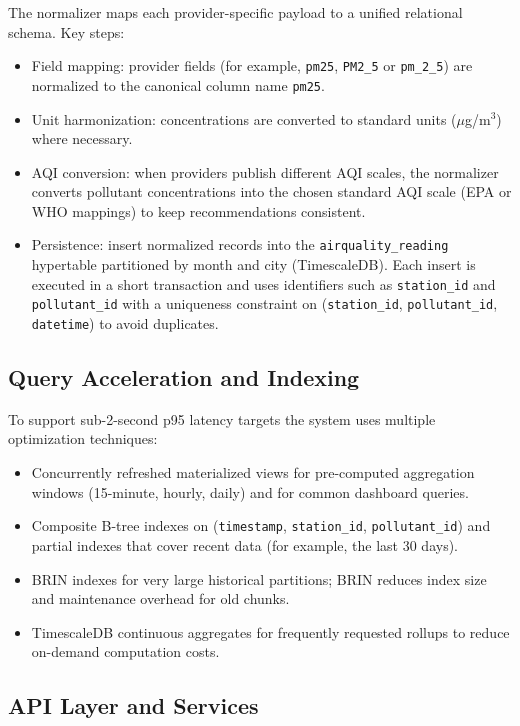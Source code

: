 The normalizer maps each provider-specific payload to a unified relational schema. Key steps:
\begin{itemize}
    \item Field mapping: provider fields (for example, \texttt{pm25}, \texttt{PM2\_5} or \texttt{pm\_2\_5}) are normalized to the canonical column name \texttt{pm25}.
    \item Unit harmonization: concentrations are converted to standard units (\(\mu\)g/m\(^{3}\)) where necessary.
    \item AQI conversion: when providers publish different AQI scales, the normalizer converts pollutant concentrations into the chosen standard AQI scale (EPA or WHO mappings) to keep recommendations consistent.
    \item Persistence: insert normalized records into the \texttt{airquality\_reading} hypertable partitioned by month and city (TimescaleDB). Each insert is executed in a short transaction and uses identifiers such as \texttt{station\_id} and \texttt{pollutant\_id} with a uniqueness constraint on (\texttt{station\_id}, \texttt{pollutant\_id}, \texttt{datetime}) to avoid duplicates.
\end{itemize}

\subsection{Query Acceleration and Indexing}
\label{subsec:method_query}

To support sub-2-second p95 latency targets the system uses multiple optimization techniques:
\begin{itemize}
    \item Concurrently refreshed materialized views for pre-computed aggregation windows (15-minute, hourly, daily) and for common dashboard queries.
    \item Composite B-tree indexes on (\texttt{timestamp}, \texttt{station\_id}, \texttt{pollutant\_id}) and partial indexes that cover recent data (for example, the last 30 days).
    \item BRIN indexes for very large historical partitions; BRIN reduces index size and maintenance overhead for old chunks.
    \item TimescaleDB continuous aggregates for frequently requested rollups to reduce on-demand computation costs.
\end{itemize}

\subsection{API Layer and Services}
\label{subsec:method_api}

